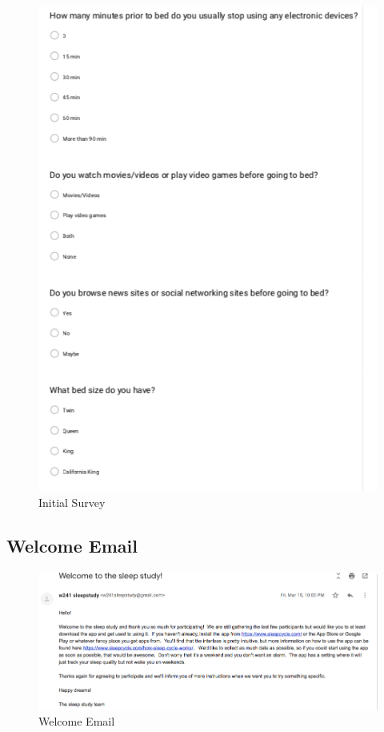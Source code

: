 \documentclass[12pt,]{article}
\begin{document}
\begin{figure}[H]

{\centering \includegraphics[width=0.8\linewidth]{img/initial_survey_2} 

}

\caption{Initial Survey}\label{fig:unnamed-chunk-7}
\end{figure}

\hypertarget{welcome-email}{%
\subsection{Welcome Email}\label{welcome-email}}

\begin{figure}[H]

{\centering \includegraphics[width=1\linewidth]{img/welcome_email} 

}

\caption{Welcome Email}\label{fig:unnamed-chunk-8}
\end{figure}
\end{document}
